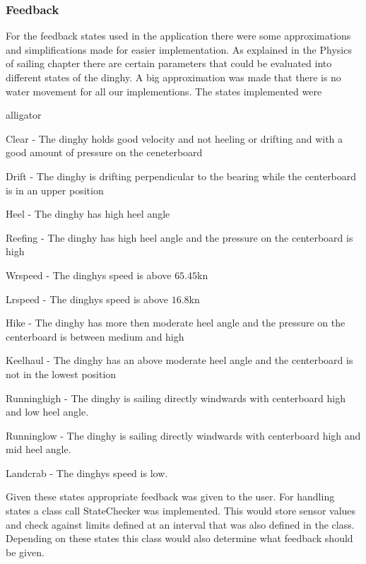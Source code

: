 \subsubsection{Feedback}
For the feedback states used in the application there were some approximations and simplifications made for easier implementation. As explained in the Physics of sailing chapter there are certain parameters that could be evaluated into different states of the dinghy. A big approximation was made that there is no water movement for all our implementions. The states implemented were
\begin{labeling}{alligator}
\item [Clear] - The dinghy holds good velocity and not heeling or drifting and with a good amount of pressure on the ceneterboard
\item [Drift] - The dinghy is drifting perpendicular to the bearing while the centerboard is in an upper position
\item [Heel] - The dinghy has high heel angle
\item [Reefing] - The dinghy has high heel angle and the pressure on the centerboard is high
\item [Wrspeed] - The dinghys speed is above $65.45$kn
\item [Lrspeed] - The dinghys speed is above $16.8$kn
\item [Hike] - The dinghy has more then moderate heel angle and the pressure on the centerboard is between medium and high
\item [Keelhaul] - The dinghy has an above moderate heel angle and the centerboard is not in the lowest position
\item [Runninghigh] - The dinghy is sailing directly windwards with centerboard high and low heel angle.
\item [Runninglow] - The dinghy is sailing directly windwards with centerboard high and mid heel angle.
\item [Landcrab] - The dinghys speed is low.
\end{labeling}
Given these states appropriate feedback was given to the user. For handling states a class call StateChecker was implemented. This would store sensor values and check against limits defined at an interval that was also defined in the class. Depending on these states this class would also determine what feedback should be given.

